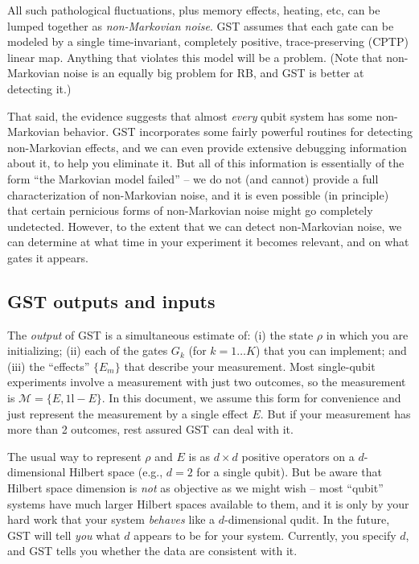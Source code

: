 \documentclass{article}[11pt]
\def\Id{1\!\mathrm{l}}
\newcommand{\cM}{\mathcal{M}}
\begin{document}
All such pathological fluctuations, plus memory effects, heating, etc, can be lumped together as \emph{non-Markovian noise}.  GST assumes that each gate can be modeled by a single time-invariant, completely positive, trace-preserving (CPTP) linear map.  Anything that violates this model will be a problem.  (Note that non-Markovian noise is an equally big problem for RB, and GST is better at detecting it.)

That said, the evidence suggests that almost \emph{every} qubit system has some non-Markovian behavior.  GST incorporates some fairly powerful routines for detecting non-Markovian effects, and we can even provide extensive debugging information about it, to help you eliminate it.  But all of this information is essentially of the form ``the Markovian model failed'' -- we do not (and cannot) provide a full characterization of non-Markovian noise, and it is even possible (in principle) that certain pernicious forms of non-Markovian noise might go completely undetected.  However, to the extent that we can detect non-Markovian noise, we can determine at what time in your experiment it becomes relevant, and on what gates it appears.

\subsection{GST outputs and inputs}

The \emph{output} of GST is a simultaneous estimate of: (i) the state $\rho$ in which you are initializing; (ii) each of the gates $G_k$ (for $k=1\ldots K$) that you can implement; and (iii) the ``effects'' $\{E_m\}$ that describe your measurement.  Most single-qubit experiments involve a measurement with just two outcomes, so the measurement is $\cM = \{E,\Id-E\}$.  In this document, we assume this form for convenience and just represent the measurement by a single effect $E$.  But if your measurement has more than 2 outcomes, rest assured GST can deal with it.

The usual way to represent $\rho$ and $E$ is as $d\times d$ positive operators on a $d$-dimensional Hilbert space (e.g., $d=2$ for a single qubit).  But be aware that Hilbert space dimension is \emph{not} as objective as we might wish -- most ``qubit'' systems have much larger Hilbert spaces available to them, and it is only by your hard work that your system \emph{behaves} like a $d$-dimensional qudit.  In the future, GST will tell \emph{you} what $d$ appears to be for your system.  Currently, you specify $d$, and GST tells you whether the data are consistent with it.
\end{document}
